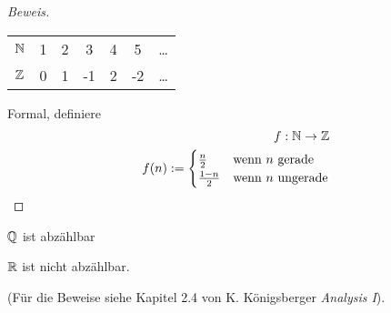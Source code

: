 \begin{proof}[Beweis]
  \begin{tabular}{c|cccccc}
    $\mathbb{N}$ & 1 & 2 & 3 & 4 & 5 & \ldots \\
    $\mathbb{Z}$ & 0 & 1 & -1 & 2 & -2 & \ldots
  \end{tabular}

\medskip

Formal, definiere
  \begin{align*}
    f:\mathbb{N}\to \mathbb{Z}\\
    f(n):=\begin{cases}
      \frac{n}{2} & \text{wenn $n$ gerade}\\
      \frac{1-n}{2} & \text{wenn $n$ ungerade}
    \end{cases}
  \end{align*}
\end{proof}
\begin{Sat}
  $\mathbb{Q}$ ist abzählbar
\end{Sat}

\begin{Sat}
  $\mathbb{R}$ ist nicht abzählbar.
\end{Sat}
(F\"ur die Beweise siehe Kapitel 2.4 von K. K\"onigsberger {\em Analysis I}).
